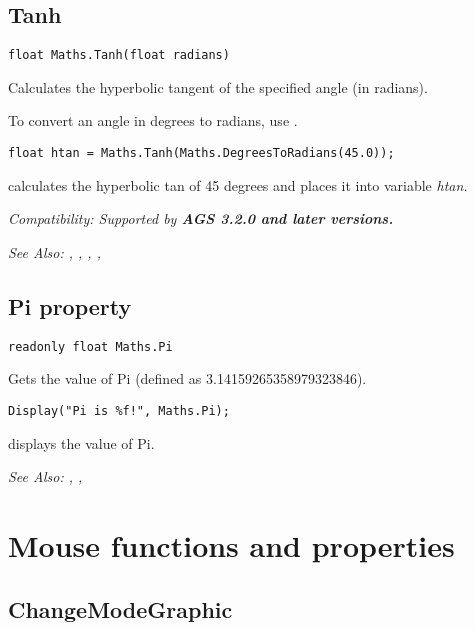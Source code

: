 \subsection{Tanh}\label{Maths.Tanh}%

\begin{verbatim}
float Maths.Tanh(float radians)
\end{verbatim}
Calculates the hyperbolic tangent of the specified angle (in radians).

To convert an angle in degrees to radians, use .

\begin{verbatim}
float htan = Maths.Tanh(Maths.DegreesToRadians(45.0));
\end{verbatim}
calculates the hyperbolic tan of 45 degrees and places it into variable \it{htan}.

\it{Compatibility:} Supported by \bf{AGS 3.2.0} and later versions.

\it{See Also:} ,
,
,
, 


\subsection{Pi property}\label{Maths.Pi}%

\begin{verbatim}
readonly float Maths.Pi
\end{verbatim}
Gets the value of Pi (defined as 3.14159265358979323846).

\begin{verbatim}
Display("Pi is %f!", Maths.Pi);
\end{verbatim}
displays the value of Pi.

\it{See Also:} , ,



\section{Mouse functions and properties}%


\subsection{ChangeModeGraphic}\label{Mouse.ChangeModeGraphic}%

